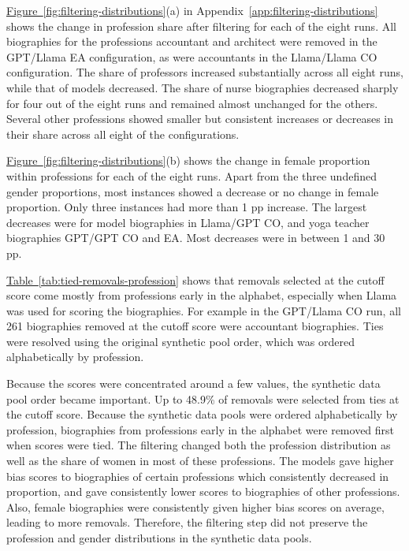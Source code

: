 \documentclass[sigconf]{acmart}
\begin{document}


\hyperref[fig:filtering-distributions]{Figure~\ref*{fig:filtering-distributions}}(a) in Appendix~\ref{app:filtering-distributions} shows the change in profession share after filtering for each of the eight runs. All biographies for the professions accountant and architect were removed in the GPT/Llama EA configuration, as were accountants in the Llama/Llama CO configuration.
The share of professors increased substantially across all eight runs, while that of models decreased. The share of nurse biographies decreased sharply for four out of the eight runs and remained almost unchanged for the others.  Several other professions showed smaller but consistent increases or decreases in their share across all eight of the configurations.

\hyperref[fig:filtering-distributions]{Figure~\ref*{fig:filtering-distributions}}(b) shows the change in female proportion within professions for each of the eight runs. Apart from the three undefined gender proportions, most instances showed a decrease or no change in female proportion. Only three instances had more than 1 pp increase. The largest decreases were for model biographies in Llama/GPT CO,
and yoga teacher biographies GPT/GPT CO and EA. Most decreases were in between 1 and 30 pp.



\hyperref[tab:tied-removals-profession]{Table~\ref*{tab:tied-removals-profession}} shows that removals selected at the cutoff score come mostly from professions early in the alphabet, especially when Llama was used for scoring the biographies. For example in the GPT/Llama CO run, all 261 biographies removed at the cutoff score were accountant biographies. Ties were resolved using the original synthetic pool order, which was ordered alphabetically by profession.

Because the scores were concentrated around a few values, the synthetic data pool order became important. Up to 48.9\% of removals were selected from ties at the cutoff score. Because the synthetic data pools were ordered alphabetically by profession, biographies from professions early in the alphabet were removed first when scores were tied.
The filtering changed both the profession distribution as well as the share of women in most of these professions. The models gave higher bias scores to biographies of certain professions which consistently decreased in proportion, and gave consistently lower scores to biographies of other professions. Also, female biographies were consistently given higher bias scores on average, leading to more removals. Therefore, the filtering step did not preserve the profession and gender distributions in the synthetic data pools.
\end{document}
